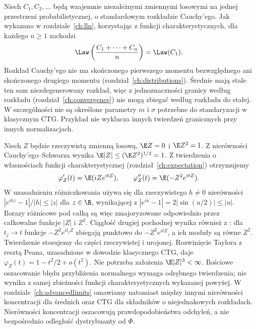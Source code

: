 \begin{przyklad}
Niech $C_1,C_2,\ldots$ będą wzajemnie niezależnymi
zmiennymi losowymi na jednej przestrzeni
probabilistycznej, o standardowym rozkładzie Cauchy'ego.
Jak wykazano w rozdziale~\ref{ch:lln}, korzystając
z funkcji charakterystycznych, dla każdego $n\geq1$
zachodzi
\[
\Law\left(\frac{C_1+\cdots+C_n}{n}\right)=\Law(C_1).
\]
Rozkład Cauchy'ego nie ma skończonego pierwszego
momentu bezwzględnego ani skończonego drugiego
momentu (rozdział~\ref{ch:distributions}).
Średnie mają stale ten sam niezdegenerowany
rozkład, więc z jednoznaczności granicy według
rozkładu (rozdział~\ref{ch:convergence}) nie mogą
zbiegać według rozkładu do stałej.
W szczególności nie są określone parametry $m$
i $\sigma$ potrzebne do standaryzacji w klasycznym
CTG. Przykład nie wyklucza innych twierdzeń
granicznych przy innych normalizacjach.
\end{przyklad}

\begin{uwaga}
Niech $Z$ będzie rzeczywistą zmienną losową,
$\E Z=0$ i $\E Z^2=1$.
Z nierówności Cauchy'ego--Schwarza wynika
$\E|Z|\leq(\E Z^2)^{1/2}=1$.
Z twierdzenia o własnościach funkcji charakterystycznej
(rozdział~\ref{ch:expectation}) otrzymujemy
\[
\varphi_Z'(t)=\E(iZe^{itZ}),\qquad
\varphi_Z''(t)=\E(-Z^2e^{itZ}).
\]
W uzasadnieniu różniczkowania używa się dla
rzeczywistego $h\ne0$ nierówności
$|e^{ihz}-1|/|h|\leq|z|$ dla $z\in\R$,
wynikającej z $|e^{iu}-1|=2|\sin(u/2)|\leq|u|$.
Ilorazy różnicowe pod całką są więc zmajoryzowane
odpowiednio przez całkowalne funkcje $|Z|$ i $Z^2$.
Ciągłość drugiej pochodnej wynika również z
:
dla $t_j\to t$ funkcje $-Z^2e^{it_jZ}$ zbiegają
punktowo do $-Z^2e^{itZ}$, a ich moduły są równe $Z^2$.
Twierdzenie stosujemy do części rzeczywistej
i urojonej. Rozwinięcie Taylora z resztą Peana,
uzasadnione w dowodzie klasycznego CTG, daje
$\varphi_Z(t)=1-t^2/2+o(t^2)$.
Nie potrzeba założenia $\E|Z|^3<\infty$.
Ilościowe oszacowanie błędu przybliżenia normalnego
wymaga odrębnego twierdzenia; nie wynika z samej
zbieżności funkcji charakterystycznych wykazanej
powyżej. W rozdziale~\ref{ch:advancedlimits}
omawiamy natomiast między innymi nierówności
koncentracji dla średnich oraz CTG dla składników
o niejednakowych rozkładach. Nierówności koncentracji
oszacowują prawdopodobieństwa odchyleń, a nie
bezpośrednio odległość dystrybuanty od $\Phi$.
\end{uwaga}

